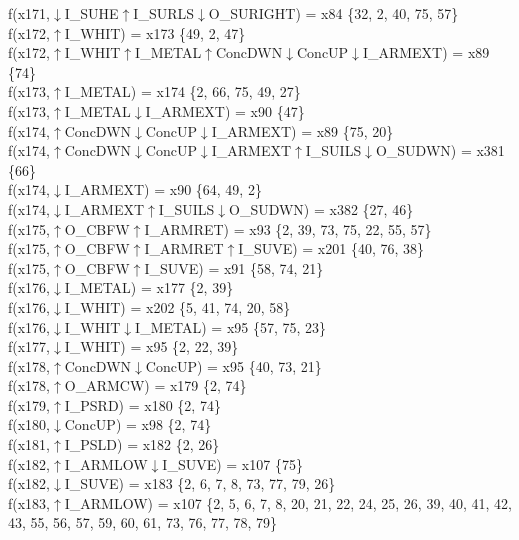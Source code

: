 f(x171,$\downarrow$I\_SUHE$\uparrow$I\_SURLS$\downarrow$O\_SURIGHT) = x84 \{32, 2, 40, 75, 57\} \\  
f(x172,$\uparrow$I\_WHIT) = x173 \{49, 2, 47\} \\  
f(x172,$\uparrow$I\_WHIT$\uparrow$I\_METAL$\uparrow$ConcDWN$\downarrow$ConcUP$\downarrow$I\_ARMEXT) = x89 \{74\} \\  
f(x173,$\uparrow$I\_METAL) = x174 \{2, 66, 75, 49, 27\} \\  
f(x173,$\uparrow$I\_METAL$\downarrow$I\_ARMEXT) = x90 \{47\} \\  
f(x174,$\uparrow$ConcDWN$\downarrow$ConcUP$\downarrow$I\_ARMEXT) = x89 \{75, 20\} \\  
f(x174,$\uparrow$ConcDWN$\downarrow$ConcUP$\downarrow$I\_ARMEXT$\uparrow$I\_SUILS$\downarrow$O\_SUDWN) = x381 \{66\} \\  
f(x174,$\downarrow$I\_ARMEXT) = x90 \{64, 49, 2\} \\  
f(x174,$\downarrow$I\_ARMEXT$\uparrow$I\_SUILS$\downarrow$O\_SUDWN) = x382 \{27, 46\} \\  
f(x175,$\uparrow$O\_CBFW$\uparrow$I\_ARMRET) = x93 \{2, 39, 73, 75, 22, 55, 57\} \\  
f(x175,$\uparrow$O\_CBFW$\uparrow$I\_ARMRET$\uparrow$I\_SUVE) = x201 \{40, 76, 38\} \\  
f(x175,$\uparrow$O\_CBFW$\uparrow$I\_SUVE) = x91 \{58, 74, 21\} \\  
f(x176,$\downarrow$I\_METAL) = x177 \{2, 39\} \\  
f(x176,$\downarrow$I\_WHIT) = x202 \{5, 41, 74, 20, 58\} \\  
f(x176,$\downarrow$I\_WHIT$\downarrow$I\_METAL) = x95 \{57, 75, 23\} \\  
f(x177,$\downarrow$I\_WHIT) = x95 \{2, 22, 39\} \\  
f(x178,$\uparrow$ConcDWN$\downarrow$ConcUP) = x95 \{40, 73, 21\} \\  
f(x178,$\uparrow$O\_ARMCW) = x179 \{2, 74\} \\  
f(x179,$\uparrow$I\_PSRD) = x180 \{2, 74\} \\  
f(x180,$\downarrow$ConcUP) = x98 \{2, 74\} \\  
f(x181,$\uparrow$I\_PSLD) = x182 \{2, 26\} \\  
f(x182,$\uparrow$I\_ARMLOW$\downarrow$I\_SUVE) = x107 \{75\} \\  
f(x182,$\downarrow$I\_SUVE) = x183 \{2, 6, 7, 8, 73, 77, 79, 26\} \\  
f(x183,$\uparrow$I\_ARMLOW) = x107 \{2, 5, 6, 7, 8, 20, 21, 22, 24, 25, 26, 39, 40, 41, 42, 43, 55, 56, 57, 59, 60, 61, 73, 76, 77, 78, 79\} \\  
